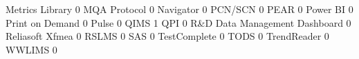 \documentclass{article}
\begin{document}
\begin{Schunk}
\begin{Soutput}
  Metrics Library                                                                 0
  MQA Protocol                                                                    0
  Navigator                                                                       0
  PCN/SCN                                                                         0
  PEAR                                                                            0
  Power BI                                                                        0
  Print on Demand                                                                 0
  Pulse                                                                           0
  QIMS                                                                            1
  QPI                                                                             0
  R&D Data Management Dashboard                                                   0
  Reliasoft Xfmea                                                                 0
  RSLMS                                                                           0
  SAS                                                                             0
  TestComplete                                                                    0
  TODS                                                                            0
  TrendReader                                                                     0
  WWLIMS                                                                          0
                                                           

\end{Soutput}
\end{Schunk}
\end{document}

